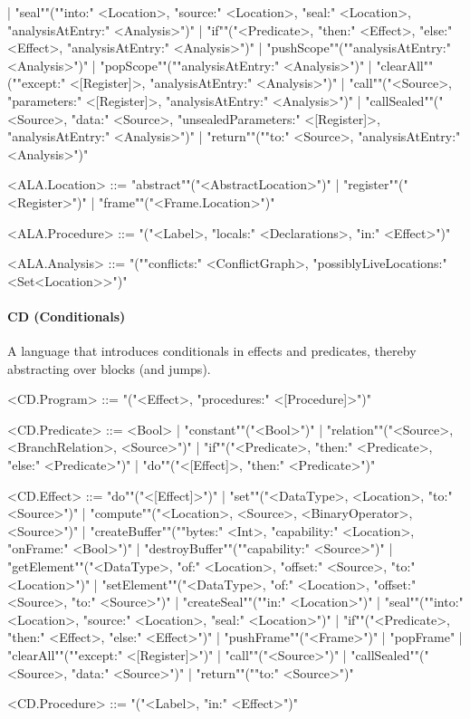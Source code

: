 \documentclass[main.tex]{subfiles}
\begin{document}
\begin{grammar}
						| "seal""(""into:" <Location>, "source:" <Location>, "seal:" <Location>, "analysisAtEntry:" <Analysis>")"
						| "if""("<Predicate>, "then:" <Effect>, "else:" <Effect>, "analysisAtEntry:" <Analysis>")"
						| "pushScope""(""analysisAtEntry:" <Analysis>")"
						| "popScope""(""analysisAtEntry:" <Analysis>")"
						| "clearAll""(""except:" <[Register]>, "analysisAtEntry:" <Analysis>")"
						| "call""("<Source>, "parameters:" <[Register]>, "analysisAtEntry:" <Analysis>")"
						| "callSealed""("<Source>, "data:" <Source>, "unsealedParameters:" <[Register]>, "analysisAtEntry:" <Analysis>")"
						| "return""(""to:" <Source>, "analysisAtEntry:" <Analysis>")"
				\par
				<ALA.Location> ::=
						"abstract""("<AbstractLocation>")"
						| "register""("<Register>")"
						| "frame""("<Frame.Location>")"
				\par
				<ALA.Procedure> ::=
							"("<Label>, "locals:" <Declarations>, "in:" <Effect>")"
				\par
				<ALA.Analysis> ::=
							"(""conflicts:" <ConflictGraph>, "possiblyLiveLocations:" <Set<Location>>")"
				\par
\end{grammar}
\par
\paragraph{ CD (Conditionals) } A language that introduces conditionals in effects and predicates, thereby abstracting over blocks (and jumps).
\begin{grammar}
	\footnotesize
				<CD.Program> ::=
							"("<Effect>, "procedures:" <[Procedure]>")"
				\par
				<CD.Predicate> ::=
						<Bool> |
						"constant""("<Bool>")"
						| "relation""("<Source>, <BranchRelation>, <Source>")"
						| "if""("<Predicate>, "then:" <Predicate>, "else:" <Predicate>")"
						| "do""("<[Effect]>, "then:" <Predicate>")"
				\par
				<CD.Effect> ::=
						"do""("<[Effect]>")"
						| "set""("<DataType>, <Location>, "to:" <Source>")"
						| "compute""("<Location>, <Source>, <BinaryOperator>, <Source>")"
						| "createBuffer""(""bytes:" <Int>, "capability:" <Location>, "onFrame:" <Bool>")"
						| "destroyBuffer""(""capability:" <Source>")"
						| "getElement""("<DataType>, "of:" <Location>, "offset:" <Source>, "to:" <Location>")"
						| "setElement""("<DataType>, "of:" <Location>, "offset:" <Source>, "to:" <Source>")"
						| "createSeal""(""in:" <Location>")"
						| "seal""(""into:" <Location>, "source:" <Location>, "seal:" <Location>")"
						| "if""("<Predicate>, "then:" <Effect>, "else:" <Effect>")"
						| "pushFrame""("<Frame>")"
						| "popFrame"
						| "clearAll""(""except:" <[Register]>")"
						| "call""("<Source>")"
						| "callSealed""("<Source>, "data:" <Source>")"
						| "return""(""to:" <Source>")"
				\par
				<CD.Procedure> ::=
							"("<Label>, "in:" <Effect>")"
				\par
\end{grammar}
\par
\end{document}
